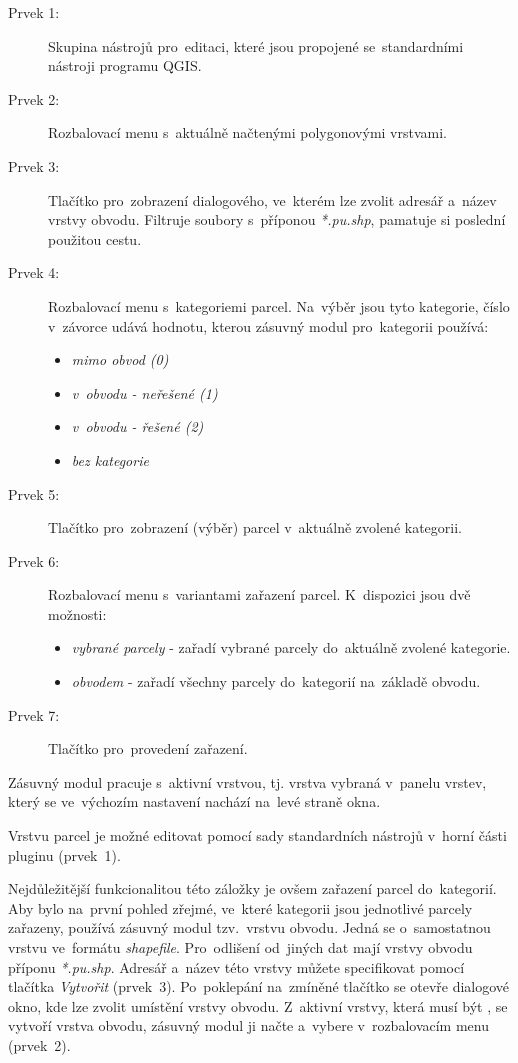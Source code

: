 \begin{description}
	\item[Prvek 1:] Skupina nástrojů pro~editaci, které jsou propojené se~standardními nástroji programu QGIS.
	\item[Prvek 2:] Rozbalovací menu s~aktuálně načtenými polygonovými vrstvami.
	\item[Prvek 3:] Tlačítko pro~zobrazení dialogového, ve~kterém lze zvolit adresář a~název vrstvy obvodu. Filtruje soubory s~příponou \textit{*.pu.shp}, pamatuje si poslední použitou cestu.
	\item[Prvek 4:] Rozbalovací menu s~kategoriemi parcel. Na~výběr jsou tyto kategorie, číslo v~závorce udává hodnotu, kterou zásuvný modul pro~kategorii používá:
	\begin{itemize}[leftmargin=1.5cm, noitemsep]
		\item \textit{mimo obvod (0)}
		\item \textit{v~obvodu - neřešené (1)}
		\item \textit{v~obvodu - řešené (2)}
		\item \textit{bez kategorie}
	\end{itemize}
	\item[Prvek 5:] Tlačítko pro~zobrazení (výběr) parcel v~aktuálně zvolené kategorii.
	\item[Prvek 6:] Rozbalovací menu s~variantami zařazení parcel. K~dispozici jsou dvě možnosti:
	\begin{itemize}[leftmargin=1.5cm, noitemsep]
		\item \textit{vybrané parcely} - zařadí vybrané parcely do~aktuálně zvolené kategorie.
		\item \textit{obvodem} - zařadí všechny parcely do~kategorií na~základě obvodu.
	\end{itemize}
	\item[Prvek 7:] Tlačítko pro~provedení zařazení.
\end{description}

Zásuvný modul pracuje s~aktivní vrstvou, tj. vrstva vybraná v~panelu vrstev, který se ve~výchozím nastavení nachází na~levé straně okna.

Vrstvu parcel je možné editovat pomocí sady standardních nástrojů v~horní části pluginu (prvek~1).

Nejdůležitější funkcionalitou této záložky je ovšem zařazení parcel do~kategorií. Aby bylo na~první pohled zřejmé, ve~které kategorii jsou jednotlivé parcely zařazeny, používá zásuvný modul tzv.~vrstvu obvodu. Jedná se o~samostatnou vrstvu ve~formátu \textit{shapefile}. Pro~odlišení od~jiných dat mají vrstvy obvodu příponu \textit{*.pu.shp}. Adresář a~název této vrstvy můžete specifikovat pomocí tlačítka \textit{Vytvořit} (prvek~3). Po~poklepání na~zmíněné tlačítko se otevře dialogové okno, kde lze zvolit umístění vrstvy obvodu. Z~aktivní vrstvy, která musí být , se vytvoří vrstva obvodu, zásuvný modul ji načte a~vybere v~rozbalovacím menu (prvek~2).

